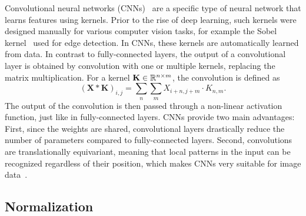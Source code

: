 Convolutional neural networks (CNNs)~\cite{CNN} are a specific type of neural network that learns features using
kernels.
Prior to the rise of deep learning, such kernels were designed manually for various computer vision tasks, for example
the Sobel kernel~\cite{Sobel} used for edge detection.
In CNNs, these kernels are automatically learned from data. In contrast to fully-connected layers, the output of a
convolutional layer is obtained by convolution with one or multiple kernels, replacing the matrix multiplication.
For a kernel $\mathbf{K} \in \mathbb{R}^{n \times m}$, the convolution is defined as
\begin{equation}
    (\mathbf{X} \ast \mathbf{K})_{i,j} = \sum_{n}\sum_{m} X_{i+n,j+m} \cdot K_{n,m}.
\end{equation}
The output of the convolution is then passed through a non-linear activation function, just like in fully-connected
layers.
CNNs provide two main advantages: First, since the weights are shared, convolutional layers drastically reduce the
number of parameters compared to fully-connected layers. 
Second, convolutions are translationally equivariant, meaning that local patterns in the input can be recognized 
regardless of their position, which makes CNNs very suitable for image data~\cite{DeepLearning}.

\subsection{Normalization}

\newcommand{\cube}[2]{
    \fill[gray!10, opacity=0.5] (0,0,\a) -- (\a,0,\a) -- (\a,\a,\a) -- (0,\a,\a) -- cycle;
    \fill[gray!10, opacity=0.5] (0,0,0) -- (\a,0,0) -- (\a,0,\a) -- (0,0,\a) -- cycle;
    \fill[gray!10, opacity=0.5] (0,0,0) -- (0,\a,0) -- (0,\a,\a) -- (0,0,\a) -- cycle;

    \draw[thick] (0,#1,0) -- (0,0,0) -- (#1,0,0);
    \draw[thick] (0,#1,0) -- (0,#1,#1);
    \draw[thick] (0,0,0) -- (0,0,#1);
    \draw[thick] (#1,0,0) -- (#1,0,#1);
    \draw[thick] (0,#1,#1) -- (0,0,#1) -- (#1,0,#1) -- (#1,#1,#1) -- cycle;

    \foreach \i in {1,2,...,#1} {
        \draw[very thin] (0,\i,0) -- (0,\i,#1);
        \draw[very thin] (0,0,\i) -- (0,#1,\i);

        \draw[very thin] (\i,0,0) -- (\i,0,#1);
        \draw[very thin] (0,0,\i) -- (#1,0,\i);

        \draw[very thin] (\i,0,#1) -- (\i,#1,#1);
        \draw[very thin] (0,\i,#1) -- (#1,\i,#1);
    }

    \node[rotate=90] at (0,#1,#1/2) [above] {$H,W$};
    \node at (0,#1/2,0) [below left] {$C$};
    \node at (#1/2,0,0) [below right] {$N$};

    \node at (#1,#1,#1+1) {#2};
}

